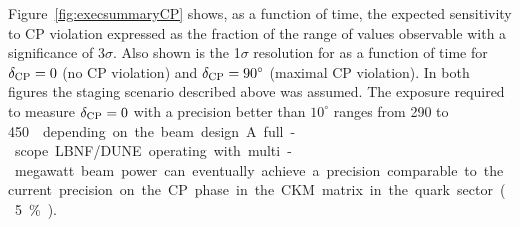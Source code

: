 %
Figure~\ref{fig:execsummaryCP} shows, as a function of time, the
expected sensitivity to CP violation expressed as the fraction of the
range of \deltacp values observable with a significance of
3$\sigma$. Also shown is the 1$\sigma$ resolution for \deltacp as a
function of time for $\delta_{\rm CP}=0$ (no CP violation) and
$\delta_{\rm CP}=90^\circ$ (maximal CP violation). In both figures the staging scenario
described above was assumed.  The exposure required to measure
$\delta_{\rm CP} = 0 $ with a precision better than $10^\circ$ ranges
from 290 to \SI{450}\ktMWyr{} depending on the beam design.
A full-scope LBNF/DUNE operating with multi-megawatt 
beam power can eventually achieve a precision 
comparable to the current precision on the CP phase in the
CKM matrix in the quark sector (5\%).

